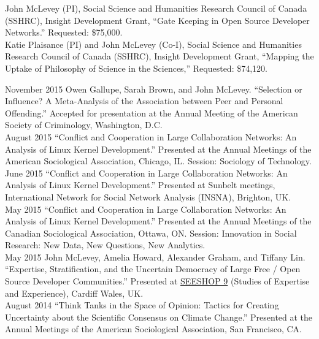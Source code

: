 \documentclass[9pt,usenames,dvipsnames]{article}
\begin{document}
\ind John McLevey (PI), Social Science and Humanities Research Council of Canada (SSHRC), Insight Development Grant, ``Gate Keeping in Open Source Developer Networks.'' Requested: \$75,000. \\

\ind Katie Plaisance (PI) and John McLevey (Co-I), Social Science and Humanities Research Council of Canada (SSHRC), Insight Development Grant, ``Mapping the Uptake of Philosophy of Science in the Sciences,'' Requested: \$74,120. \\



\ind November 2015 Owen Gallupe, Sarah Brown, and John McLevey. ``Selection or Influence? A Meta-Analysis of the Association between Peer and Personal Offending.'' Accepted for presentation at the Annual Meeting of the American Society of Criminology, Washington, D.C.\\

\ind August 2015 ``Conflict and Cooperation in Large Collaboration Networks: An Analysis of Linux Kernel Development.'' Presented at the Annual Meetings of the American Sociological Association, Chicago, IL. Session: Sociology of Technology. \\

\ind June 2015 ``Conflict and Cooperation in Large Collaboration Networks: An Analysis of Linux Kernel Development.'' Presented at Sunbelt meetings, International Network for Social Network Analysis (INSNA), Brighton, UK. \\

\ind May 2015 ``Conflict and Cooperation in Large Collaboration Networks: An Analysis of Linux Kernel Development.'' Presented at the Annual Meetings of the Canadian Sociological Association, Ottawa, ON. Session: Innovation in Social Research: New Data, New Questions, New Analytics.\\

\ind May 2015 John McLevey, Amelia Howard, Alexander Graham, and Tiffany Lin. ``Expertise, Stratification, and the Uncertain Democracy of Large Free / Open Source Developer Communities.'' Presented at \href{http://www.cf.ac.uk/socsi/contactsandpeople/harrycollins/expertise-project/seeshophome.html}{SEESHOP 9} (Studies of Expertise and Experience), Cardiff Wales, UK. \\

\ind August 2014 ``Think Tanks in the Space of Opinion: Tactics for Creating Uncertainty about the Scientific Consensus on Climate Change.'' Presented at the Annual Meetings of the American Sociological Association, San Francisco, CA. \\
\end{document}
